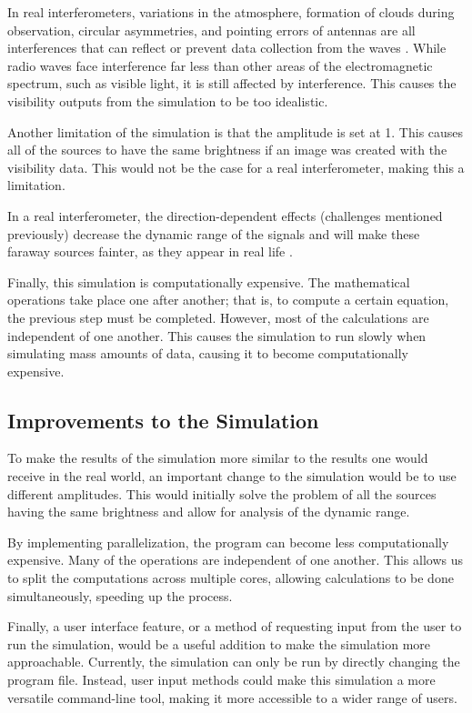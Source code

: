 \documentclass[12pt]{article}
\begin{document}
In real interferometers, variations in the atmosphere, formation of clouds during observation, circular asymmetries, and pointing errors of antennas are all interferences that can reflect or prevent data collection from the waves \cite{[8]}. While radio waves face interference far less than other areas of the electromagnetic spectrum, such as visible light, it is still affected by interference. This causes the visibility outputs from the simulation to be too idealistic. 

Another limitation of the simulation is that the amplitude is set at 1. This causes all of the sources to have the same brightness if an image was created with the visibility data. This would not be the case for a real interferometer, making this a limitation. 

In a real interferometer, the direction-dependent effects (challenges mentioned previously) decrease the dynamic range of the signals and will make these faraway sources fainter, as they appear in real life \cite{[8]}. 

Finally, this simulation is computationally expensive. The mathematical operations take place one after another; that is, to compute a certain equation, the previous step must be completed. However, most of the calculations are independent of one another. This causes the simulation to run slowly when simulating mass amounts of data, causing it to become computationally expensive. 

\subsection{Improvements to the Simulation}
To make the results of the simulation more similar to the results one would receive in the real world, an important change to the simulation would be to use different amplitudes. This would initially solve the problem of all the sources having the same brightness and allow for analysis of the dynamic range. 

By implementing parallelization, the program can become less computationally expensive. Many of the operations are independent of one another. This allows us to split the computations across multiple cores, allowing calculations to be done simultaneously, speeding up the process.

Finally, a user interface feature, or a method of requesting input from the user to run the simulation, would be a useful addition to make the simulation more approachable. Currently, the simulation can only be run by directly changing the program file. Instead, user input methods could make this simulation a more versatile command-line tool, making it more accessible to a wider range of users. 
\end{document}

